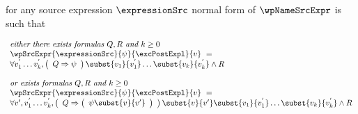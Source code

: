 \begin{wpExprSrc} \label{pogEq:aux:wpExprSrc}
for any source expression $\expressionSrc$ 
normal form of  $\wpNameSrcExpr$ is such that 

$$ \begin{array}{l}
         \mbox{\rm\textit{either  there exists formulas $ Q,R$ and $k\ge 0$ }} \\
         \wpSrcExpr{\expressionSrc }{ \psi }{ \excPostExpl}{v} \  = \\ 
	 \forall v^{'}_1 \ldots v^{'}_k, \left( \begin{array}{l} Q \Rightarrow \psi   \end{array} \right) \subst{v_1}{v^{'}_1 } \ldots \subst{v_k }{ v^{'}_k}
          \wedge 
	  R \\\\
	  \mbox{\rm\textit{or exists formulas $ Q,R $   and $k\ge 0$}} \\
 \wpSrcExpr{\expressionSrc }{ \psi }{ \excPostExpl}{v} \  = \\
      \forall v', v^{'}_1 \ldots v^{'}_k, \left( \begin{array}{l} Q \Rightarrow \left( \begin{array}{l} \psi \subst{v}{v'} \end{array} \right) \end{array} \right) \subst{v}{v'} \subst{v_1}{v^{'}_1 } \ldots \subst{v_k }{ v^{'}_k}
          \wedge 
	  R \\\\

          
									            
                                                                        
   \end{array}  $$ \\
\end{wpExprSrc}

